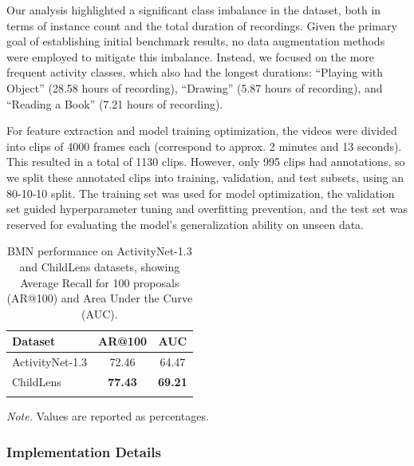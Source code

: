 \documentclass[
  man,floatsintext]{apa6}
\begin{document}
Our analysis highlighted a significant class imbalance in the dataset, both in terms of instance count and the total duration of recordings. Given the primary goal of establishing initial benchmark results, no data augmentation methods were employed to mitigate this imbalance. Instead, we focused on the more frequent activity classes, which also had the longest durations: ``Playing with Object'' (28.58 hours of recording), ``Drawing'' (5.87 hours of recording), and ``Reading a Book'' (7.21 hours of recording).

For feature extraction and model training optimization, the videos were divided into clips of 4000 frames each (correspond to approx. 2 minutes and 13 seconds). This resulted in a total of 1130 clips. However, only 995 clips had annotations, so we split these annotated clips into training, validation, and test subsets, using an 80-10-10 split. The training set was used for model optimization, the validation set guided hyperparameter tuning and overfitting prevention, and the test set was reserved for evaluating the model's generalization ability on unseen data.

\begin{table}[tbp]

\begin{center}
\begin{threeparttable}

\caption{\label{tab:bmn-results}BMN performance on ActivityNet-1.3 and ChildLens datasets, showing Average Recall for 100 proposals (AR@100) and Area Under the Curve (AUC).}

\begin{tabular}{p{6cm}cc}
\toprule
Dataset & \multicolumn{1}{c}{AR@100} & \multicolumn{1}{c}{AUC}\\
\midrule
ActivityNet-1.3 & 72.46 & 64.47\\
ChildLens & \textbf{77.43} & \textbf{69.21}\\
\bottomrule
\addlinespace
\end{tabular}

\begin{tablenotes}[para]
\normalsize{\textit{Note.} Values are reported as percentages.}
\end{tablenotes}

\end{threeparttable}
\end{center}

\end{table}

\subsubsection{Implementation Details}\label{implementation-details}
\end{document}
